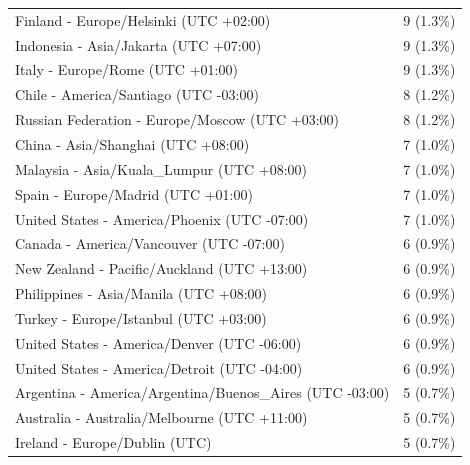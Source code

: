 \documentclass[
  english,
  man]{apa6}
\begin{document}
\begin{appendix}
\begin{table}
{\begin{tabular}[t]{ll}
\hspace{1em}Finland - Europe/Helsinki (UTC +02:00) & 9 (1.3\%)\\
\addlinespace
\hspace{1em}Indonesia - Asia/Jakarta (UTC +07:00) & 9 (1.3\%)\\
\hspace{1em}Italy - Europe/Rome (UTC +01:00) & 9 (1.3\%)\\
\hspace{1em}Chile - America/Santiago (UTC -03:00) & 8 (1.2\%)\\
\hspace{1em}Russian Federation - Europe/Moscow (UTC +03:00) & 8 (1.2\%)\\
\hspace{1em}China - Asia/Shanghai (UTC +08:00) & 7 (1.0\%)\\
\addlinespace
\hspace{1em}Malaysia - Asia/Kuala\_Lumpur (UTC +08:00) & 7 (1.0\%)\\
\hspace{1em}Spain - Europe/Madrid (UTC +01:00) & 7 (1.0\%)\\
\hspace{1em}United States - America/Phoenix (UTC -07:00) & 7 (1.0\%)\\
\hspace{1em}Canada - America/Vancouver (UTC -07:00) & 6 (0.9\%)\\
\hspace{1em}New Zealand - Pacific/Auckland (UTC +13:00) & 6 (0.9\%)\\
\addlinespace
\hspace{1em}Philippines - Asia/Manila (UTC +08:00) & 6 (0.9\%)\\
\hspace{1em}Turkey - Europe/Istanbul (UTC +03:00) & 6 (0.9\%)\\
\hspace{1em}United States - America/Denver (UTC -06:00) & 6 (0.9\%)\\
\hspace{1em}United States - America/Detroit (UTC -04:00) & 6 (0.9\%)\\
\hspace{1em}Argentina - America/Argentina/Buenos\_Aires (UTC -03:00) & 5 (0.7\%)\\
\addlinespace
\hspace{1em}Australia - Australia/Melbourne (UTC +11:00) & 5 (0.7\%)\\
\hspace{1em}Ireland - Europe/Dublin (UTC) & 5 (0.7\%)\\

\end{tabular}}
\end{table}
\end{appendix}
\end{document}
